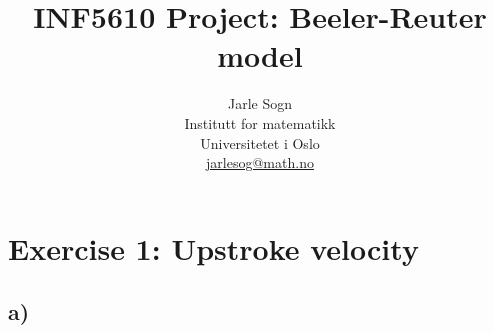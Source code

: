 \documentclass[12pt,a4paper,norsk]{article}
\title{INF5610 Project: Beeler-Reuter model}
\author{Jarle Sogn\\ Institutt for matematikk\\
Universitetet i Oslo\\ \url{jarlesog@math.no}}
\begin{document}
\maketitle


\section*{Exercise 1: Upstroke velocity}
\subsection*{a)}





%


\end{document}
